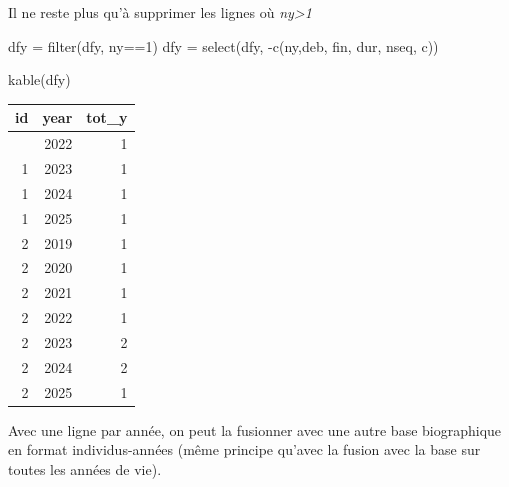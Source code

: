 \documentclass[
  12pt,
  letterpaper,
  DIV=11,
  numbers=noendperiod,
  onepage,
  openany]{scrreprt}
\newenvironment{Shaded}{\begin{snugshade}}{\end{snugshade}}
\newcommand{\AttributeTok}[1]{\textcolor[rgb]{0.80,0.80,0.80}{#1}}
\newcommand{\DecValTok}[1]{\textcolor[rgb]{0.86,0.86,0.80}{#1}}
\newcommand{\FunctionTok}[1]{\textcolor[rgb]{0.94,0.94,0.56}{#1}}
\newcommand{\NormalTok}[1]{\textcolor[rgb]{0.80,0.80,0.80}{#1}}
\newcommand{\OtherTok}[1]{\textcolor[rgb]{0.94,0.94,0.56}{#1}}
\newcommand{\SpecialCharTok}[1]{\textcolor[rgb]{0.86,0.64,0.64}{#1}}
\newcommand{\StringTok}[1]{\textcolor[rgb]{0.80,0.58,0.58}{#1}}
\begin{document}
Il ne reste plus qu'à supprimer les lignes où \emph{ny\textgreater1}

\begin{Shaded}
\begin{Highlighting}[]
\NormalTok{dfy }\OtherTok{=} \FunctionTok{filter}\NormalTok{(dfy, ny}\SpecialCharTok{==}\DecValTok{1}\NormalTok{)}
\NormalTok{dfy }\OtherTok{=} \FunctionTok{select}\NormalTok{(dfy, }\SpecialCharTok{{-}}\FunctionTok{c}\NormalTok{(ny,deb, fin, dur, nseq, c))}

\FunctionTok{kable}\NormalTok{(dfy)}
\end{Highlighting}
\end{Shaded}

\begin{longtable}[]{@{}rrr@{}}
\toprule\noalign{}
id & year & tot\_y \\
\midrule\noalign{}
\endhead
\bottomrule\noalign{}
\endlastfoot
1 & 2022 & 1 \\
1 & 2023 & 1 \\
1 & 2024 & 1 \\
1 & 2025 & 1 \\
2 & 2019 & 1 \\
2 & 2020 & 1 \\
2 & 2021 & 1 \\
2 & 2022 & 1 \\
2 & 2023 & 2 \\
2 & 2024 & 2 \\
2 & 2025 & 1 \\
\end{longtable}

Avec une ligne par année, on peut la fusionner avec une autre base
biographique en format individus-années (même principe qu'avec la fusion
avec la base sur toutes les années de vie).

\begin{Shaded}
\end{Shaded}
\end{document}
